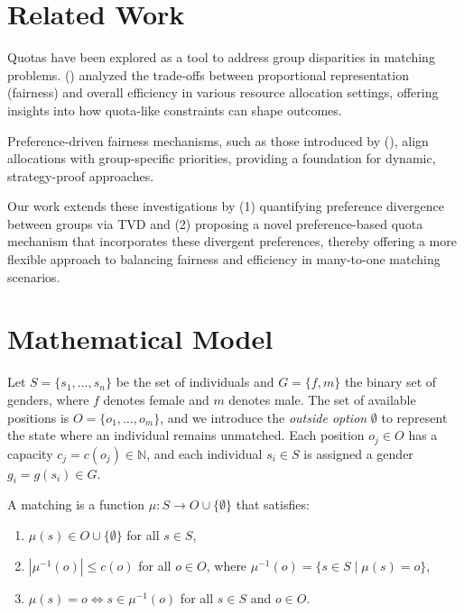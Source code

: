 \documentclass[letterpaper]{article}
\newcommand{\citet}[1]{\citeauthor{#1} (\citeyear{#1})}
\begin{document}
\section{Related Work}

Quotas have been explored as a tool to address group disparities in matching problems. 
\citet{Bertsimas2012OnTE} analyzed the trade-offs between proportional representation (fairness) and overall efficiency in various resource allocation settings, offering insights into how quota-like constraints can shape outcomes. 

Preference-driven fairness mechanisms, such as those introduced by \citet{AzizW14}, align allocations with group-specific priorities, providing a foundation for dynamic, strategy-proof approaches.

Our work extends these investigations by (1) quantifying preference divergence between groups via TVD and (2) proposing a novel preference-based quota mechanism that incorporates these divergent preferences, thereby offering a more flexible approach to balancing 
fairness and efficiency in many-to-one matching scenarios.


\section{Mathematical Model}

Let \( S = \{s_1, \ldots, s_n\} \) be the set of individuals and \( G = \{f, m\} \) the binary set of genders, where \( f \) denotes female and \( m \) denotes male. The set of available positions is \( O = \{o_1, \ldots, o_m\} \), and we introduce the \textit{outside option} \( \emptyset \) to represent the state where an individual remains unmatched. Each position \( o_j \in O \) has a capacity \( c_j = c(o_j) \in \mathbb{N} \), and each individual \( s_i \in S \) is assigned a gender \( g_i = g(s_i) \in G \).

A matching is a function \( \mu : S \to O \cup \{\emptyset\} \) that satisfies:
\begin{enumerate}
    \item \( \mu(s) \in O \cup \{\emptyset\} \) for all \( s \in S \),
    \item  \( |\mu^{-1}(o)| \leq c(o) \) for all \( o \in O \), where \( \mu^{-1}(o) = \{ s \in S \mid \mu(s) = o \} \),
    \item \( \mu(s) = o \iff s \in \mu^{-1}(o) \) for all \( s \in S \) and \( o \in O \).
\end{enumerate}
\end{document}
